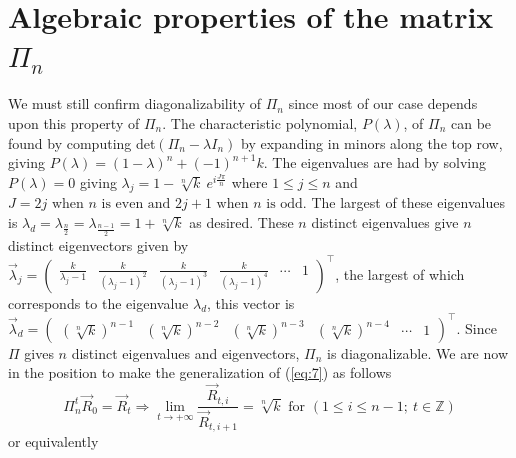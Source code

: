 \documentclass[11pt]{article}
\theoremstyle{plain}
\theoremstyle{definition}
\begin{document}
\section{Algebraic properties of the matrix $\Pi_n$}
We must still confirm diagonalizability of $\Pi_n$ since most of our case depends upon this property of $\Pi_n$. The characteristic polynomial, $P(\lambda)$, of $\Pi_n$ can be found by computing det$(\Pi_n-\lambda \textit{I}_n)$ by expanding in minors along the top row, giving $P(\lambda)=(1-\lambda)^n+(-1)^{n+1}k$. The eigenvalues are had by solving $P(\lambda)=0$ giving $\lambda_j=1-\sqrt[n]{k}\ e^{\textit{i}\frac{J\pi}{n}}$ where $1\leq j \leq n$ and
$J=2j\mbox{ when } n \mbox{ is even and } 2j+1\mbox{ when }n\mbox{ is odd.}$ The largest of these eigenvalues is $\lambda_d=\lambda_{\frac{n}{2}}=\lambda_{\frac{n-1}{2}}=1+\sqrt[n]{k}$ as desired. These $n$ distinct eigenvalues give $n$ distinct eigenvectors given by $\vec{\lambda}_j=\left(\begin{array}{cccccc}
\frac{k}{\lambda_j-1} & \frac{k}{(\lambda_j-1)^2} & \frac{k}{(\lambda_j-1)^3} & \frac{k}{(\lambda_j-1)^4} & \cdots & 1\end{array}\right)^\intercal$, the largest of which corresponds to the eigenvalue $\lambda_d$, this vector is $\vec{\lambda}_d=\left(\begin{array}{cccccc}
\left(\sqrt[n]{k}\right)^{n-1} & \left(\sqrt[n]{k}\right)^{n-2} & \left(\sqrt[n]{k}\right)^{n-3} & \left(\sqrt[n]{k}\right)^{n-4} & \cdots & 1\end{array} \right)^\intercal$. Since $\Pi$ gives $n$ distinct eigenvalues and eigenvectors, $\Pi_n$ is diagonalizable. We are now in the position to make the generalization of (\ref{eq:7}) as follows
\begin{equation}\label{eq:12}
\Pi_n^t \vec{R}_0 =\vec{R}_t \Rightarrow \displaystyle\lim_{t\to+\infty}\frac{\vec{R}_{t,i}}{\vec{R}_{t,i+1}}=\sqrt[n]{k} \mbox{ for }(1\leq i \leq n-1;\ t\in \mathbb{Z})
\end{equation}
or equivalently
\end{document}
